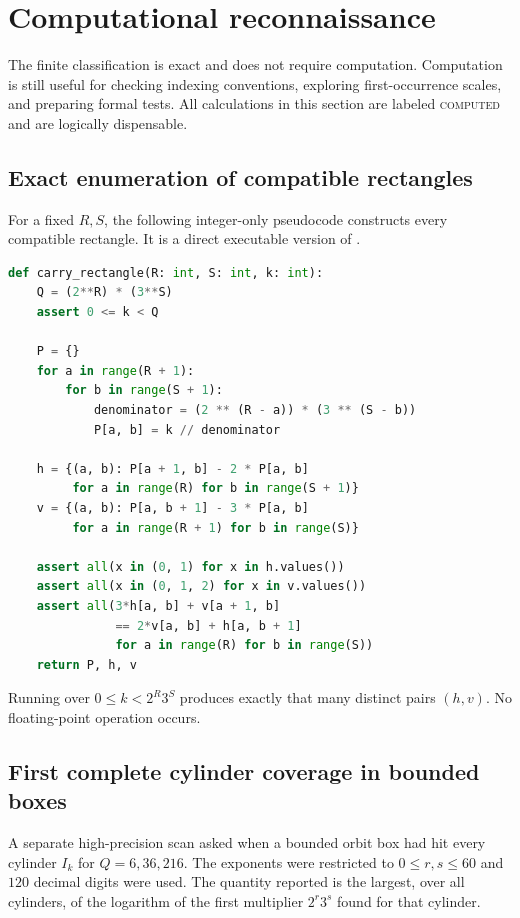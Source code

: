 \documentclass[11pt]{article}
\theoremstyle{definition}
\theoremstyle{remark}
\newcommand{\statuscomputed}{\textcolor{deepblue}{\textsc{computed}}}
\begin{document}
\section{Computational reconnaissance}
\label{sec:computation}

The finite classification is exact and does not require computation.  Computation is
still useful for checking indexing conventions, exploring first-occurrence scales,
and preparing formal tests.  All calculations in this section are labeled
\statuscomputed{} and are logically dispensable.

\subsection{Exact enumeration of compatible rectangles}

For a fixed $R,S$, the following integer-only pseudocode constructs every compatible
rectangle.  It is a direct executable version of .

\begin{lstlisting}[language=Python,caption={Exact enumeration from the cylinder index}]
def carry_rectangle(R: int, S: int, k: int):
    Q = (2**R) * (3**S)
    assert 0 <= k < Q

    P = {}
    for a in range(R + 1):
        for b in range(S + 1):
            denominator = (2 ** (R - a)) * (3 ** (S - b))
            P[a, b] = k // denominator

    h = {(a, b): P[a + 1, b] - 2 * P[a, b]
         for a in range(R) for b in range(S + 1)}
    v = {(a, b): P[a, b + 1] - 3 * P[a, b]
         for a in range(R + 1) for b in range(S)}

    assert all(x in (0, 1) for x in h.values())
    assert all(x in (0, 1, 2) for x in v.values())
    assert all(3*h[a, b] + v[a + 1, b]
               == 2*v[a, b] + h[a, b + 1]
               for a in range(R) for b in range(S))
    return P, h, v
\end{lstlisting}

Running over $0\le k<2^R3^S$ produces exactly that many distinct pairs $(h,v)$.
No floating-point operation occurs.

\subsection{First complete cylinder coverage in bounded boxes}

A separate high-precision scan asked when a bounded orbit box had hit every cylinder
$I_k$ for $Q=6,36,216$.  The exponents were restricted to $0\le r,s\le60$ and
$120$ decimal digits were used.  The quantity reported is the largest, over all
cylinders, of the logarithm of the first multiplier $2^r3^s$ found for that cylinder.
\end{document}
